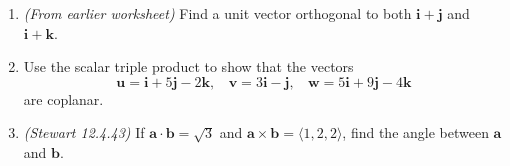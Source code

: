 \documentclass{article}
\begin{document}
\begin{enumerate}
\item {\em (From earlier worksheet)} Find a unit vector orthogonal to both $\mathbf{i} + \mathbf{j}$ and $\mathbf{i} + \mathbf{k}$.

\item Use the scalar triple product to show that the vectors
\[
\mathbf{u} = \mathbf{i} + 5\mathbf{j} - 2\mathbf{k}, ~~~~ \mathbf{v} = 3\mathbf{i} - \mathbf{j}, ~~~~ \mathbf{w} = 5\mathbf{i} + 9\mathbf{j} - 4\mathbf{k}
\]
are coplanar.

\item {\em (Stewart 12.4.43)} If $\mathbf{a} \cdot \mathbf{b} = \sqrt{3}$ and $\mathbf{a} \times \mathbf{b} = \langle 1, 2, 2\rangle$, find the angle between $\mathbf{a}$ and $\mathbf{b}$.

\end{enumerate}
\end{document}
